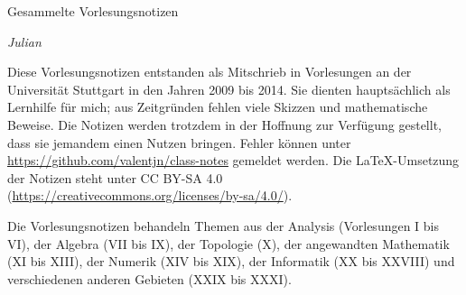 
\ihead{\leftmark}
\ifoot{\vspace{-1.5mm}\rightmark}

\thispagestyle{empty}
\vspace*{1em}

{%
  \huge%
  Gesammelte Vorlesungsnotizen%
}
\vspace*{1em}

\emph{Julian }

\vspace*{1em}

Diese Vorlesungsnotizen entstanden als Mitschrieb in Vorlesungen
an der Universität Stuttgart in den Jahren 2009 bis 2014.
Sie dienten hauptsächlich als Lernhilfe für mich;
aus Zeitgründen fehlen viele Skizzen und mathematische Beweise.
Die Notizen werden trotzdem in der Hoffnung zur Verfügung gestellt,
dass sie jemandem einen Nutzen bringen.
Fehler können unter \url{https://github.com/valentjn/class-notes} gemeldet werden.
Die \LaTeX{}-Umsetzung der Notizen steht unter CC BY-SA 4.0
(\url{https://creativecommons.org/licenses/by-sa/4.0/}).

Die Vorlesungsnotizen behandeln Themen aus
der Analysis (Vorlesungen I bis VI),
der Algebra (VII bis IX),
der Topologie (X),
der angewandten Mathematik (XI bis XIII),
der Numerik (XIV bis XIX),
der Informatik (XX bis XXVIII) und
verschiedenen anderen Gebieten (XXIX bis XXXI).

{%
  \setcounter{tocdepth}{\parttocdepth}


  \makeatletter
  \renewcommand*{\@pnumwidth}{2.7em}
  \renewcommand*{\@tocrmarg}{2.7em}
  \makeatother

  \renewcommand*{\contentsname}{Vorlesungen}
  \tableofcontents%
}

\pagebreak

{%
  \manualmark{}


  \setcounter{tocdepth}{\subsubsectiontocdepth}

  \tableofcontents%
}

\pagebreak



